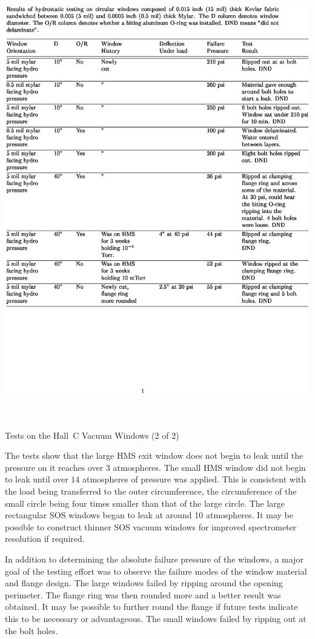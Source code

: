 \begin{table}
\includegraphics[height=7.5in]{vacuumc}
\caption{Tests on the Hall~C Vacuum Windows (2 of 2) \label{tab:win_tst2}}
\end{table}
\clearpage

The tests show that the large HMS exit window does not begin to leak until
the pressure on it reaches over $3$ atmospheres. The small HMS window
did not begin to leak until over $14$ atmospheres of pressure was applied.
This is consistent with the load being transferred to
the outer circumference, the circumference of the small circle being four
times smaller than that of the large circle. The large rectangular SOS windows
began to leak at around 10 atmospheres. It may be possible to construct thinner
SOS vacuum windows for improved spectrometer resolution if required.

In addition to determining the absolute failure
pressure of the windows, a major goal of the testing effort was to
observe the failure modes of the
window material and flange design. The large windows failed by
ripping around the opening perimeter. The flange ring was then
rounded more and
a better result was obtained. It may be possible to further round the
flange if future tests indicate this to be necessary or advantageous.
The small windows failed by ripping out at the bolt holes.

